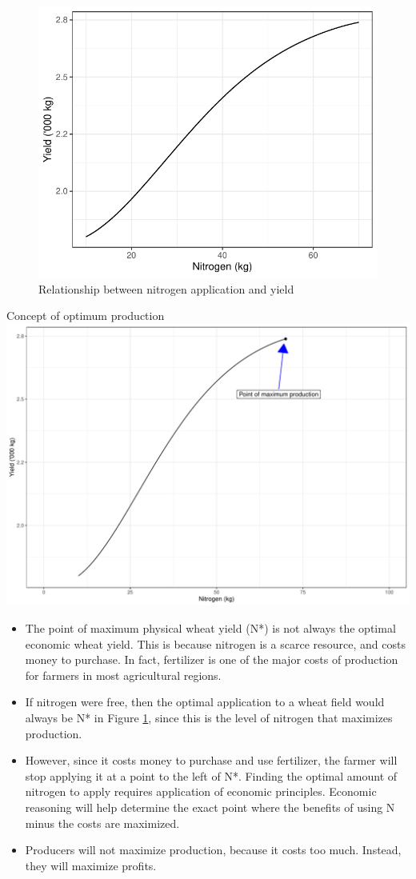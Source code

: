\documentclass[12pt,ignorenonframetext,aspectratio=169]{beamer}
\providecommand{\tightlist}{%
  \setlength{\itemsep}{0pt}\setlength{\parskip}{0pt}}
\begin{document}
\begin{frame}{}
\protect\hypertarget{section-1}{}
\begin{figure}
\includegraphics[width=0.5\linewidth]{production_relationship_files/figure-beamer/nitrogen-wheat-1} \caption{Relationship between nitrogen application and yield}\label{fig:nitrogen-wheat}
\end{figure}
\end{frame}

\begin{frame}{Concept of optimum production}
\protect\hypertarget{concept-of-optimum-production}{}
\includegraphics[width=0.45\linewidth]{production_relationship_files/figure-beamer/nitrogen-wheat-optimum-production-1}

\begin{itemize}
\tightlist
\item
  The point of maximum physical wheat yield (N*) is not always the
  optimal economic wheat yield. This is because nitrogen is a scarce
  resource, and costs money to purchase. In fact, fertilizer is one of
  the major costs of production for farmers in most agricultural
  regions.
\end{itemize}
\end{frame}

\begin{frame}{}
\protect\hypertarget{section-2}{}
\begin{itemize}
\tightlist
\item
  If nitrogen were free, then the optimal application to a wheat field
  would always be N* in Figure \ref{fig:nitrogen-wheat}, since this is
  the level of nitrogen that maximizes production.
\item
  However, since it costs money to purchase and use fertilizer, the
  farmer will stop applying it at a point to the left of N*. Finding the
  optimal amount of nitrogen to apply requires application of economic
  principles. Economic reasoning will help determine the exact point
  where the benefits of using N minus the costs are maximized.
\item
  Producers will not maximize production, because it costs too much.
  Instead, they will maximize profits.
\end{itemize}
\end{frame}
\end{document}
